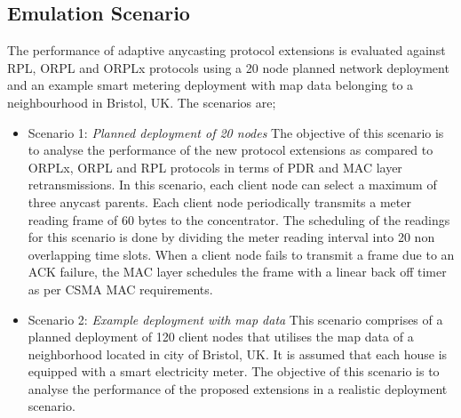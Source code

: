 \documentclass[conference]{IEEEtran}
\begin{document}
\subsection {Emulation Scenario}
The performance of adaptive anycasting protocol extensions is evaluated against RPL, ORPL and ORPLx protocols using a 20 node planned network deployment and an example smart metering deployment with map data belonging to a neighbourhood in Bristol, UK. The scenarios are;
\begin{itemize}
\item{Scenario 1: \emph{Planned deployment of 20 nodes}}
The objective of this scenario is to analyse the performance of the new protocol extensions as compared to ORPLx, ORPL and RPL protocols in terms of PDR and MAC layer retransmissions. In this scenario, each client node can select a maximum of three anycast parents. Each client node periodically transmits a meter reading frame of 60 bytes to the concentrator. The scheduling of the readings for this scenario is done by dividing the meter reading interval into 20 non overlapping time slots. When a client node fails to transmit a frame due to an ACK failure, the MAC layer schedules the frame with a linear back
off timer as per CSMA MAC requirements.

\item{Scenario 2:  \emph{Example deployment with map data}}
This scenario comprises of a planned deployment of 120 client nodes that utilises the map data of a neighborhood located in city of Bristol, UK. It is assumed that each house is equipped with a smart electricity meter. The objective of this scenario is to analyse the performance of the proposed extensions in a realistic deployment scenario.

\end{itemize}
\end{document}
